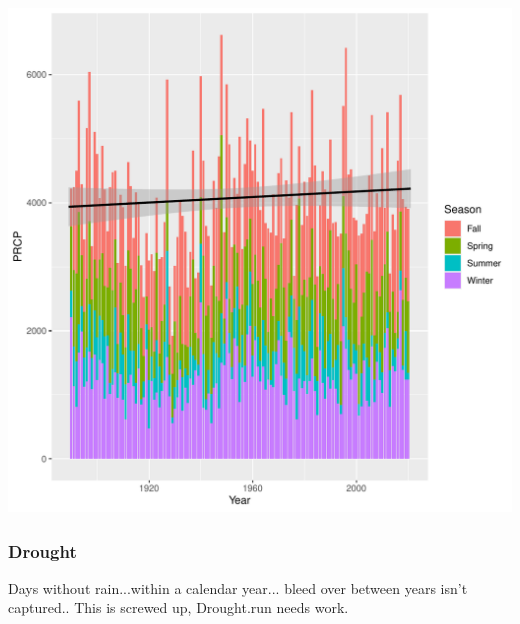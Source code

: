 \documentclass{article}
\begin{document}
\begin{knitrout}
\color{fgcolor}\begin{kframe}


{\ttfamily\noindent\itshape{}}\end{kframe}
\includegraphics[width=\maxwidth]{figure/unnamed-chunk-9-1} 
\end{knitrout}

\subsubsection{Drought}

Days without rain...within a calendar year... bleed over between years isn't captured.. This is screwed up, Drought.run needs work.
\end{document}
